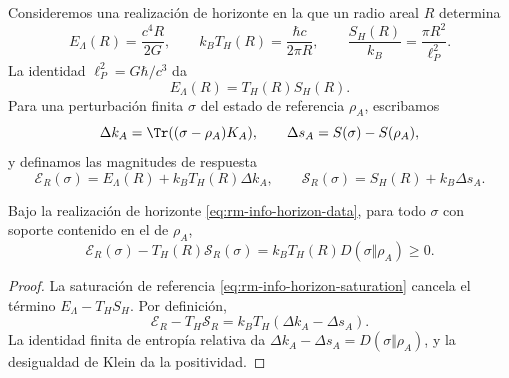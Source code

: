 Consideremos una realizaci\'on de horizonte en la que un radio areal \(R\)
determina
\begin{equation}
 E_\Lambda(R)=\frac{c^4R}{2G},
 \qquad
 k_BT_H(R)=\frac{\hbar c}{2\pi R},
 \qquad
 \frac{S_H(R)}{k_B}=\frac{\pi R^2}{\ell_P^2}.
 \label{eq:rm-info-horizon-data}
\end{equation}
La identidad \(\ell_P^2=G\hbar/c^3\) da
\begin{equation}
 \boxed{E_\Lambda(R)=T_H(R)S_H(R).}
 \label{eq:rm-info-horizon-saturation}
\end{equation}
Para una perturbaci\'on finita \(\sigma\) del estado de referencia
\(\rho_A\), escribamos
\begin{equation}
 \Delta k_A=\Tr((\sigma-\rho_A)K_A),
 \qquad
 \Delta s_A=S(\sigma)-S(\rho_A),
 \label{eq:rm-info-delta-k-s}
\end{equation}
y definamos las magnitudes de respuesta
\begin{equation}
 \mathcal E_R(\sigma)
 =E_\Lambda(R)+k_BT_H(R)\Delta k_A,
 \qquad
 \mathcal S_R(\sigma)
 =S_H(R)+k_B\Delta s_A.
 \label{eq:rm-info-response-energy-entropy}
\end{equation}

\begin{theorem}
\label{thm:rm-info-free-energy}
Bajo la realizaci\'on de horizonte
\cref{eq:rm-info-horizon-data}, para todo \(\sigma\) con soporte contenido
en el de \(\rho_A\),
\begin{equation}
 \boxed{
 \mathcal E_R(\sigma)-T_H(R)\mathcal S_R(\sigma)
 =k_BT_H(R)D(\sigma\Vert\rho_A)
 \geq0.}
 \label{eq:rm-info-free-energy}
\end{equation}
\end{theorem}

\begin{proof}
La saturaci\'on de referencia
\cref{eq:rm-info-horizon-saturation} cancela el t\'ermino
\(E_\Lambda-T_HS_H\). Por definici\'on,
\[
 \mathcal E_R-T_H\mathcal S_R
 =k_BT_H(\Delta k_A-\Delta s_A).
\]
La identidad finita de entrop\'ia relativa da
\(\Delta k_A-\Delta s_A=D(\sigma\Vert\rho_A)\), y la desigualdad de Klein
da la positividad.
\end{proof}

